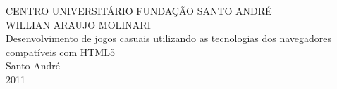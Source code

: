 \thispagestyle{empty}
\begin{center}
\large CENTRO UNIVERSITÁRIO FUNDAÇÃO SANTO ANDRÉ \\
\vspace{1cm}
\large WILLIAN ARAUJO MOLINARI \\
\vspace{8cm}
\huge Desenvolvimento de jogos casuais utilizando as tecnologias dos navegadores compatíveis com HTML5 \\
\vspace{8cm}
\large Santo André \\
\large 2011 \\
\end{center}
